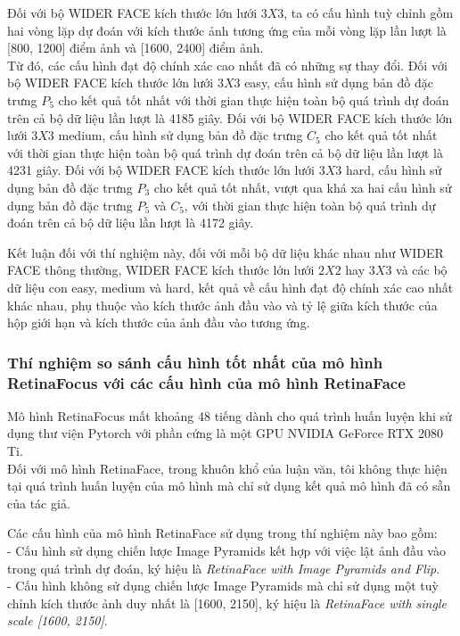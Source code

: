 {    \noindent
    Đối với bộ WIDER FACE kích thước lớn lưới $3 X 3$, ta có cấu hình tuỳ chỉnh gồm hai vòng lặp dự đoán với kích thước ảnh tương ứng của mỗi vòng lặp lần lượt là [800, 1200] điểm ảnh và [1600, 2400] điểm ảnh. \\
    Từ đó, các cấu hình đạt độ chính xác cao nhất đã có những sự thay đổi.
    Đối với bộ WIDER FACE kích thước lớn lưới $3 X 3$ easy, cấu hình sử dụng bản đồ đặc trưng ${P}_{5}$ cho kết quả tốt nhất với thời gian thực hiện toàn bộ quá trình dự đoán trên cả bộ dữ liệu lần lượt là 4185 giây.
    Đối với bộ WIDER FACE kích thước lớn lưới $3 X 3$ medium, cấu hình sử dụng bản đồ đặc trưng ${C}_{5}$ cho kết quả tốt nhất với thời gian thực hiện toàn bộ quá trình dự đoán trên cả bộ dữ liệu lần lượt là 4231 giây.
    Đối với bộ WIDER FACE kích thước lớn lưới $3 X 3$ hard, cấu hình sử dụng bản đồ đặc trưng ${P}_{3}$ cho kết quả tốt nhất, vượt qua khá xa hai cấu hình sử dụng bản đồ đặc trưng ${P}_{5}$ và ${C}_{5}$, với thời gian thực hiện toàn bộ quá trình dự đoán trên cả bộ dữ liệu lần lượt là 4172 giây.

    \noindent
    Kết luận đối với thí nghiệm này, đối với mỗi bộ dữ liệu khác nhau như WIDER FACE thông thường, WIDER FACE kích thước lớn lưới $2 X 2$ hay $3 X 3$ và các bộ dữ liệu con easy, medium và hard, kết quả về cấu hình đạt độ chính xác cao nhất khác nhau, phụ thuộc vào kích thước ảnh đầu vào và tỷ lệ giữa kích thước của hộp giới hạn và kích thước của ảnh đầu vào tương ứng.

    \subsubsection*{Thí nghiệm so sánh cấu hình tốt nhất của mô hình RetinaFocus với các cấu hình của mô hình RetinaFace}
    Mô hình RetinaFocus mất khoảng 48 tiếng dành cho quá trình huấn luyện khi sử dụng thư viện Pytorch với phần cứng là một GPU NVIDIA GeForce RTX 2080 Ti. \\
    Đối với mô hình RetinaFace, trong khuôn khổ của luận văn, tôi không thực hiện tại quá trình huấn luyện của mô hình mà chỉ sử dụng kết quả mô hình đã có sẵn của tác giả.
    
    \noindent
    Các cấu hình của mô hình RetinaFace sử dụng trong thí nghiệm này bao gồm: \\
    - Cấu hình sử dụng chiến lược Image Pyramids kết hợp với việc lật ảnh đầu vào trong quá trình dự đoán, ký hiệu là \textit{RetinaFace with Image Pyramids and Flip}. \\
    - Cấu hình không sử dụng chiến lược Image Pyramids mà chỉ sử dụng một tuỳ chỉnh kích thước ảnh duy nhất là [1600, 2150], ký hiệu là \textit{RetinaFace with single scale [1600, 2150]}.

}
